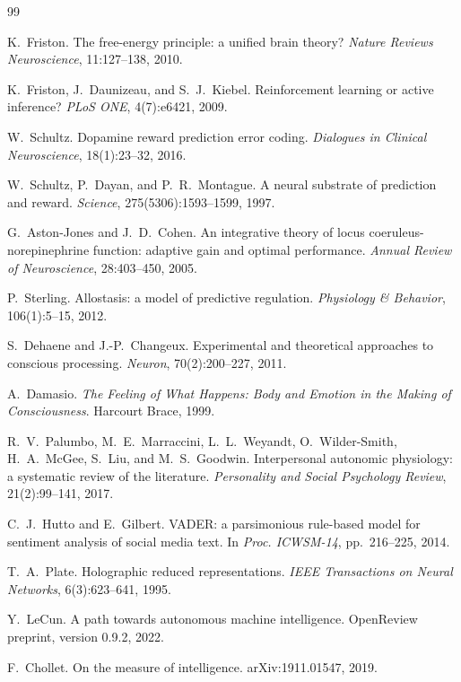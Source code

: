 \documentclass[11pt]{article}
\begin{document}
\begin{thebibliography}{99}
\small

 K.~Friston. The free-energy principle: a unified
brain theory? \emph{Nature Reviews Neuroscience}, 11:127--138, 2010.

 K.~Friston, J.~Daunizeau, and S.~J.~Kiebel.
Reinforcement learning or active inference? \emph{PLoS ONE},
4(7):e6421, 2009.

 W.~Schultz. Dopamine reward prediction error
coding. \emph{Dialogues in Clinical Neuroscience}, 18(1):23--32, 2016.

 W.~Schultz, P.~Dayan, and P.~R.~Montague. A
neural substrate of prediction and reward. \emph{Science},
275(5306):1593--1599, 1997.

 G.~Aston-Jones and J.~D.~Cohen. An integrative
theory of locus coeruleus-norepinephrine function: adaptive gain and
optimal performance. \emph{Annual Review of Neuroscience},
28:403--450, 2005.

 P.~Sterling. Allostasis: a model of predictive
regulation. \emph{Physiology \& Behavior}, 106(1):5--15, 2012.

 S.~Dehaene and J.-P.~Changeux. Experimental and
theoretical approaches to conscious processing. \emph{Neuron},
70(2):200--227, 2011.

 A.~Damasio. \emph{The Feeling of What Happens: Body
and Emotion in the Making of Consciousness}. Harcourt Brace, 1999.

 R.~V.~Palumbo, M.~E.~Marraccini, L.~L.~Weyandt,
O.~Wilder-Smith, H.~A.~McGee, S.~Liu, and M.~S.~Goodwin. Interpersonal
autonomic physiology: a systematic review of the literature.
\emph{Personality and Social Psychology Review}, 21(2):99--141, 2017.

 C.~J.~Hutto and E.~Gilbert. VADER: a parsimonious
rule-based model for sentiment analysis of social media text. In
\emph{Proc. ICWSM-14}, pp.~216--225, 2014.

 T.~A.~Plate. Holographic reduced representations.
\emph{IEEE Transactions on Neural Networks}, 6(3):623--641, 1995.

 Y.~LeCun. A path towards autonomous machine
intelligence. OpenReview preprint, version 0.9.2, 2022.

 F.~Chollet. On the measure of intelligence.
arXiv:1911.01547, 2019.


\end{thebibliography}
\end{document}
